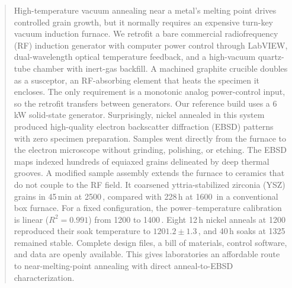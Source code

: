 \documentclass[%
 aip,
 rsi,%
 amsmath,amssymb,
 reprint,%
]{revtex4-2}
\newif\ifdraftnotes
\newcommand{\todo}[1]{\ifdraftnotes{\color{red}\textbf{[TODO: #1]}}\fi}
\begin{document}
\begin{abstract}
High-temperature vacuum annealing near a metal's melting point drives
controlled grain growth, but it normally requires an expensive turn-key
vacuum induction furnace. We retrofit a bare commercial radiofrequency
(RF) induction generator with computer power control through LabVIEW,
dual-wavelength optical temperature feedback, and a high-vacuum
quartz-tube chamber with inert-gas backfill. A machined graphite crucible
doubles as a susceptor, an RF-absorbing element that heats the specimen
it encloses. The only requirement is a monotonic analog power-control
input, so the retrofit transfers between generators. Our reference build
uses a 6\,kW solid-state generator. Surprisingly, nickel annealed in this
system produced high-quality electron backscatter diffraction (EBSD)
patterns with zero specimen preparation. Samples went directly from the
furnace to the electron microscope without grinding, polishing, or
etching. The EBSD maps indexed hundreds of equiaxed grains delineated by
deep thermal grooves. A modified sample assembly extends the furnace to
ceramics that do not couple to the RF field. It coarsened
yttria-stabilized zirconia (YSZ) grains in 45\,min at 2500\,\celsius,
compared with 228\,h at 1600\,\celsius{} in a conventional box furnace.
For a fixed configuration, the power--temperature calibration is linear
($R^2 = 0.991$) from 1200 to 1400\,\celsius. Eight 12\,h nickel anneals
at 1200\,\celsius{} reproduced their soak temperature to
$1201.2 \pm 1.3$\,\celsius, and 40\,h soaks at 1325\,\celsius{} remained
stable. Complete design files, a bill of materials, control software, and
data are openly available. This gives laboratories an affordable route to
near-melting-point annealing with direct anneal-to-EBSD characterization.
\end{abstract}


\maketitle

\ifdraftnotes
\noindent\fbox{\parbox{\linewidth}{\small\textbf{Status:} restyled
("real person") variant of paper.tex; content is identical, prose is
rewritten in the Extension-to-ceramics style. \todo{}-marked items flag
values that still need to be confirmed before submission.}}
\fi
\end{document}
